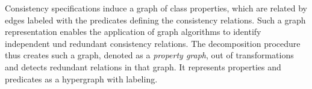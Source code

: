Consistency specifications induce a graph of class properties, which are related by edges labeled with the predicates defining the consistency relations.
Such a graph representation enables the application of graph algorithms to identify independent und redundant consistency relations.
The decomposition procedure thus creates such a graph, denoted as a \emph{property graph}, out of \qvtr transformations and detects redundant relations in that graph.
It represents properties and predicates as a hypergraph with labeling.

